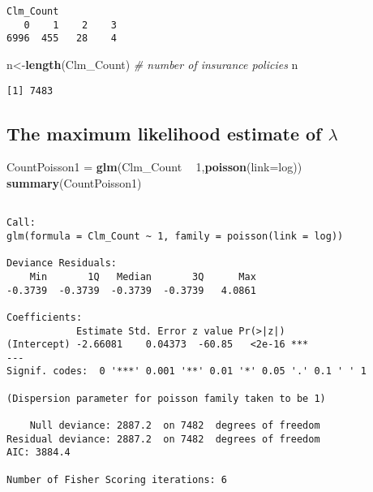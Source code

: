 \documentclass[]{book}
\newenvironment{Shaded}{\begin{snugshade}}{\end{snugshade}}
\newcommand{\KeywordTok}[1]{\textcolor[rgb]{0.13,0.29,0.53}{\textbf{#1}}}
\newcommand{\DataTypeTok}[1]{\textcolor[rgb]{0.13,0.29,0.53}{#1}}
\newcommand{\DecValTok}[1]{\textcolor[rgb]{0.00,0.00,0.81}{#1}}
\newcommand{\StringTok}[1]{\textcolor[rgb]{0.31,0.60,0.02}{#1}}
\newcommand{\CommentTok}[1]{\textcolor[rgb]{0.56,0.35,0.01}{\textit{#1}}}
\newcommand{\OperatorTok}[1]{\textcolor[rgb]{0.81,0.36,0.00}{\textbf{#1}}}
\newcommand{\NormalTok}[1]{#1}
\theoremstyle{definition}
\theoremstyle{definition}
\theoremstyle{definition}
\theoremstyle{remark}
\begin{document}
\begin{verbatim}
Clm_Count
   0    1    2    3 
6996  455   28    4 
\end{verbatim}

\begin{Shaded}
\begin{Highlighting}[]
\NormalTok{n<-}\KeywordTok{length}\NormalTok{(Clm_Count)  }\CommentTok{# number of insurance policies }
\NormalTok{n}
\end{Highlighting}
\end{Shaded}

\begin{verbatim}
[1] 7483
\end{verbatim}

\subsection{\texorpdfstring{The maximum likelihood estimate of
\(\lambda\)}{The maximum likelihood estimate of \textbackslash{}lambda}}\label{the-maximum-likelihood-estimate-of-lambda}

\begin{Shaded}
\begin{Highlighting}[]
\NormalTok{CountPoisson1 =}\StringTok{ }\KeywordTok{glm}\NormalTok{(Clm_Count }\OperatorTok{~}\StringTok{ }\DecValTok{1}\NormalTok{,}\KeywordTok{poisson}\NormalTok{(}\DataTypeTok{link=}\NormalTok{log))}
\KeywordTok{summary}\NormalTok{(CountPoisson1)}
\end{Highlighting}
\end{Shaded}

\begin{verbatim}

Call:
glm(formula = Clm_Count ~ 1, family = poisson(link = log))

Deviance Residuals: 
    Min       1Q   Median       3Q      Max  
-0.3739  -0.3739  -0.3739  -0.3739   4.0861  

Coefficients:
            Estimate Std. Error z value Pr(>|z|)    
(Intercept) -2.66081    0.04373  -60.85   <2e-16 ***
---
Signif. codes:  0 '***' 0.001 '**' 0.01 '*' 0.05 '.' 0.1 ' ' 1

(Dispersion parameter for poisson family taken to be 1)

    Null deviance: 2887.2  on 7482  degrees of freedom
Residual deviance: 2887.2  on 7482  degrees of freedom
AIC: 3884.4

Number of Fisher Scoring iterations: 6
\end{verbatim}
\end{document}
